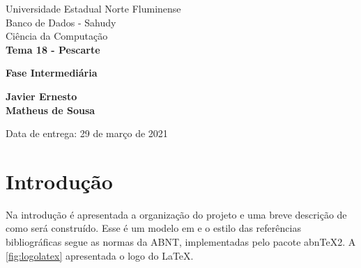 \documentclass[11pt]{../../classes/ifscarticle}
\begin{document}
\begin{center}

    {\large Universidade Estadual Norte Fluminense}\\[0.2cm] %
    {\large Banco de Dados - Sahudy }\\[0.2cm] %
    {\large Ciência da Computação}\\[5.2cm]
    

{\Huge \bfseries Tema 18 - Pescarte}

\vspace{.5cm}

{\LARGE \bfseries Fase Intermediária}

\vfill
\end{center}
\begin{tabbing}
   
\end{tabbing}

{\noindent \large \bfseries 
Javier Ernesto 
\\[.5em] Matheus de Sousa  
}


\begin{flushright}
Data de entrega: 29 de mar\c{c}o de 2021
\end{flushright}

\clearpage
\pagestyle{firstpage}

\tableofcontents
\clearpage


\section{Introdução}
\label{sec:introducao}

Na introdução é apresentada a organização do projeto e uma breve descrição de como será construído. Esse é um modelo em e o estilo das referências bibliográficas segue as normas da ABNT, implementadas pelo pacote abnTeX2. A \autoref{fig:logolatex} apresentada o logo do \LaTeX.
\end{document}
